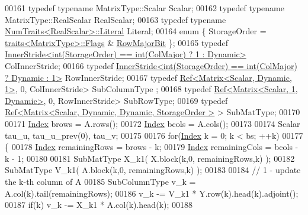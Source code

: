 \begin{DoxyCode}
00161   \textcolor{keyword}{typedef} \textcolor{keyword}{typename} MatrixType::Scalar Scalar;
00162   \textcolor{keyword}{typedef} \textcolor{keyword}{typename} MatrixType::RealScalar RealScalar;
00163   \textcolor{keyword}{typedef} \textcolor{keyword}{typename} \hyperlink{group___core___module_struct_eigen_1_1_num_traits}{NumTraits<RealScalar>::Literal} Literal;
00164   \textcolor{keyword}{enum} \{ StorageOrder = \hyperlink{struct_eigen_1_1internal_1_1traits}{traits<MatrixType>::Flags} & 
      \hyperlink{group__flags_gae4f56c2a60bbe4bd2e44c5b19cbe8762}{RowMajorBit} \};
00165   \textcolor{keyword}{typedef} \hyperlink{class_eigen_1_1_inner_stride}{InnerStride<int(StorageOrder) == int(ColMajor) ? 1 : Dynamic>}
       ColInnerStride;
00166   \textcolor{keyword}{typedef} \hyperlink{class_eigen_1_1_inner_stride}{InnerStride<int(StorageOrder) == int(ColMajor) ? Dynamic : 1>}
       RowInnerStride;
00167   \textcolor{keyword}{typedef} \hyperlink{group___core___module_class_eigen_1_1_ref}{Ref<Matrix<Scalar, Dynamic, 1>}, 0, ColInnerStride>    SubColumnType
      ;
00168   \textcolor{keyword}{typedef} \hyperlink{group___core___module_class_eigen_1_1_ref}{Ref<Matrix<Scalar, 1, Dynamic>}, 0, RowInnerStride>    SubRowType;
00169   \textcolor{keyword}{typedef} \hyperlink{group___core___module_class_eigen_1_1_ref}{Ref<Matrix<Scalar, Dynamic, Dynamic, StorageOrder >}
       > SubMatType;
00170   
00171   \hyperlink{class_eigen_1_1internal_1_1_upper_bidiagonalization_adcb14f3919a3dcc9977ba6b8105087fe}{Index} brows = A.rows();
00172   \hyperlink{class_eigen_1_1internal_1_1_upper_bidiagonalization_adcb14f3919a3dcc9977ba6b8105087fe}{Index} bcols = A.cols();
00173 
00174   Scalar tau\_u, tau\_u\_prev(0), tau\_v;
00175 
00176   \textcolor{keywordflow}{for}(\hyperlink{class_eigen_1_1internal_1_1_upper_bidiagonalization_adcb14f3919a3dcc9977ba6b8105087fe}{Index} k = 0; k < bs; ++k)
00177   \{
00178     \hyperlink{class_eigen_1_1internal_1_1_upper_bidiagonalization_adcb14f3919a3dcc9977ba6b8105087fe}{Index} remainingRows = brows - k;
00179     \hyperlink{class_eigen_1_1internal_1_1_upper_bidiagonalization_adcb14f3919a3dcc9977ba6b8105087fe}{Index} remainingCols = bcols - k - 1;
00180 
00181     SubMatType X\_k1( X.block(k,0, remainingRows,k) );
00182     SubMatType V\_k1( A.block(k,0, remainingRows,k) );
00183 
00184     \textcolor{comment}{// 1 - update the k-th column of A}
00185     SubColumnType v\_k = A.col(k).tail(remainingRows);
00186           v\_k -= V\_k1 * Y.row(k).head(k).adjoint();
00187     \textcolor{keywordflow}{if}(k) v\_k -= X\_k1 * A.col(k).head(k);
00188     

\end{DoxyCode}
